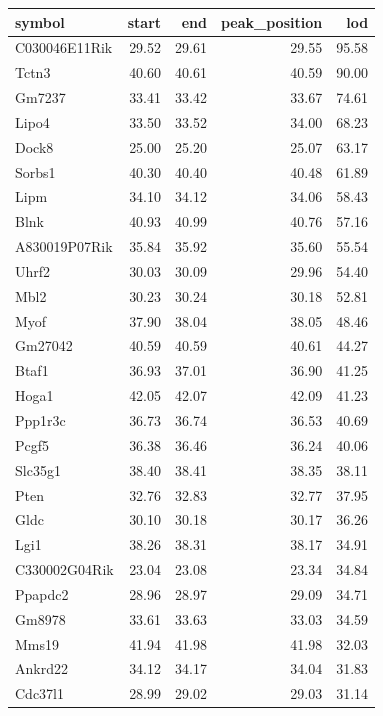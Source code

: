 \documentclass{article}
\begin{document}
\printbibliography
\begin{table}[ht]
\centering
\begingroup\tiny
\begin{tabular}{lrrrr}
  \hline
symbol & start & end & peak\_position & lod \\ 
  \hline
C030046E11Rik & 29.52 & 29.61 & 29.55 & 95.58 \\ 
  Tctn3 & 40.60 & 40.61 & 40.59 & 90.00 \\ 
  Gm7237 & 33.41 & 33.42 & 33.67 & 74.61 \\ 
  Lipo4 & 33.50 & 33.52 & 34.00 & 68.23 \\ 
  Dock8 & 25.00 & 25.20 & 25.07 & 63.17 \\ 
  Sorbs1 & 40.30 & 40.40 & 40.48 & 61.89 \\ 
  Lipm & 34.10 & 34.12 & 34.06 & 58.43 \\ 
  Blnk & 40.93 & 40.99 & 40.76 & 57.16 \\ 
  A830019P07Rik & 35.84 & 35.92 & 35.60 & 55.54 \\ 
  Uhrf2 & 30.03 & 30.09 & 29.96 & 54.40 \\ 
  Mbl2 & 30.23 & 30.24 & 30.18 & 52.81 \\ 
  Myof & 37.90 & 38.04 & 38.05 & 48.46 \\ 
  Gm27042 & 40.59 & 40.59 & 40.61 & 44.27 \\ 
  Btaf1 & 36.93 & 37.01 & 36.90 & 41.25 \\ 
  Hoga1 & 42.05 & 42.07 & 42.09 & 41.23 \\ 
  Ppp1r3c & 36.73 & 36.74 & 36.53 & 40.69 \\ 
  Pcgf5 & 36.38 & 36.46 & 36.24 & 40.06 \\ 
  Slc35g1 & 38.40 & 38.41 & 38.35 & 38.11 \\ 
  Pten & 32.76 & 32.83 & 32.77 & 37.95 \\ 
  Gldc & 30.10 & 30.18 & 30.17 & 36.26 \\ 
  Lgi1 & 38.26 & 38.31 & 38.17 & 34.91 \\ 
  C330002G04Rik & 23.04 & 23.08 & 23.34 & 34.84 \\ 
  Ppapdc2 & 28.96 & 28.97 & 29.09 & 34.71 \\ 
  Gm8978 & 33.61 & 33.63 & 33.03 & 34.59 \\ 
  Mms19 & 41.94 & 41.98 & 41.98 & 32.03 \\ 
  Ankrd22 & 34.12 & 34.17 & 34.04 & 31.83 \\ 
  Cdc37l1 & 28.99 & 29.02 & 29.03 & 31.14 \\ 

\end{tabular}
\end{table}
\end{document}
